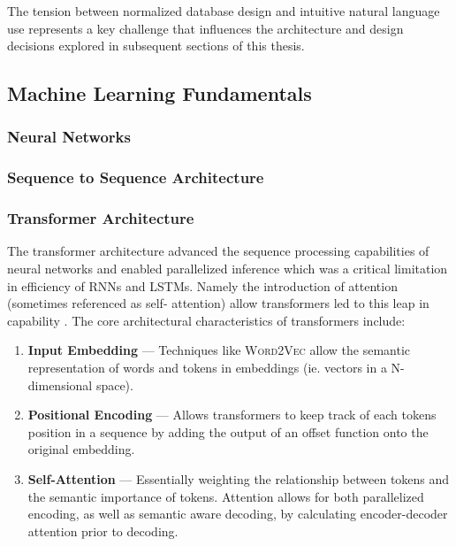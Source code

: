 \documentclass{article}
\begin{document}
The tension between normalized database design and intuitive natural language use represents a key challenge that influences
the architecture and design decisions explored in subsequent sections of this thesis.

\subsection{Machine Learning Fundamentals}

\subsubsection{Neural Networks}


\subsubsection{Sequence to Sequence Architecture}

\subsubsection{Transformer Architecture}

The transformer architecture advanced the sequence processing capabilities of neural networks and enabled parallelized inference
which was a critical limitation in efficiency of RNNs and LSTMs. Namely the introduction of attention (sometimes referenced as self-
attention) allow transformers led to this leap in capability \citep{Attention}. The core architectural characteristics of transformers
include:

\begin{enumerate}
	\item \textbf{Input Embedding} — Techniques like \textsc{Word2Vec} allow the semantic representation of words and tokens in 
		embeddings (ie. vectors in a N-dimensional space).
	\item \textbf{Positional Encoding} — Allows transformers to keep track of each tokens position in a sequence by adding the
	 	output of an offset function onto the original embedding.
	\item \textbf{Self-Attention} — Essentially weighting the relationship between tokens and the semantic importance of tokens.
	    Attention allows for both parallelized encoding, as well as semantic aware decoding, by calculating encoder-decoder attention 
	    prior to decoding.              
\end{enumerate}
\end{document}
